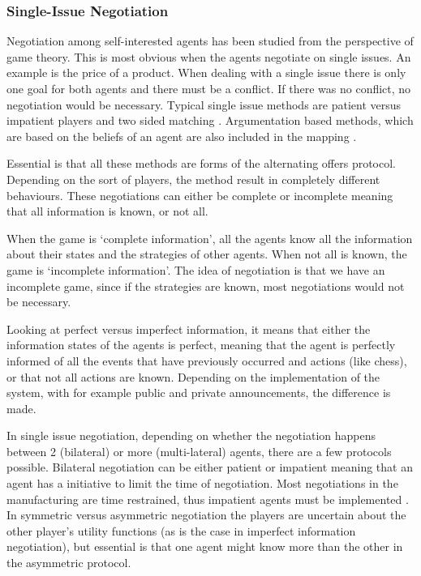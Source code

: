 \subsubsection{Single-Issue Negotiation}

Negotiation among self-interested agents has been studied from the perspective of game theory. This is most obvious when the agents negotiate on single issues. An example is the price of a product. When dealing with a single issue there is only one goal for both agents and there must be a conflict. If there was no conflict, no negotiation would be necessary. Typical single issue methods are patient versus impatient players and two sided matching \citep{fatima2014principles}. Argumentation based methods, which are based on the beliefs of an agent are also included in the mapping \citep{li2013automated}.

Essential is that all these methods are forms of the alternating offers protocol. Depending on the sort of players, the method result in completely different behaviours. These negotiations can either be complete or incomplete meaning that all information is known, or not all. 

When the game is `complete information', all the agents know all the information about their states and the strategies of other agents. When not all is known, the game is `incomplete information'. The idea of negotiation is that we have an incomplete game, since if the strategies are known, most negotiations would not be necessary.

Looking at perfect versus imperfect information, it means that either the information states of the agents is perfect, meaning that the agent is perfectly informed of all the events that have previously occurred and actions (like chess), or that not all actions are known. Depending on the implementation of the system, with for example public and private announcements, the difference is made. 

In single issue negotiation, depending on whether the negotiation happens between 2 (bilateral) or more (multi-lateral) agents, there are a few protocols possible. Bilateral negotiation can be either patient or impatient \citep{fatima2014negotiation} meaning that an agent has a initiative to limit the time of negotiation. Most negotiations in the manufacturing are time restrained, thus impatient agents must be implemented \citep{kraus1995multiagent}. In symmetric versus asymmetric negotiation the players are uncertain about the other player's utility functions (as is the case in imperfect information negotiation), but essential is that one agent might know more than the other in the asymmetric protocol.

